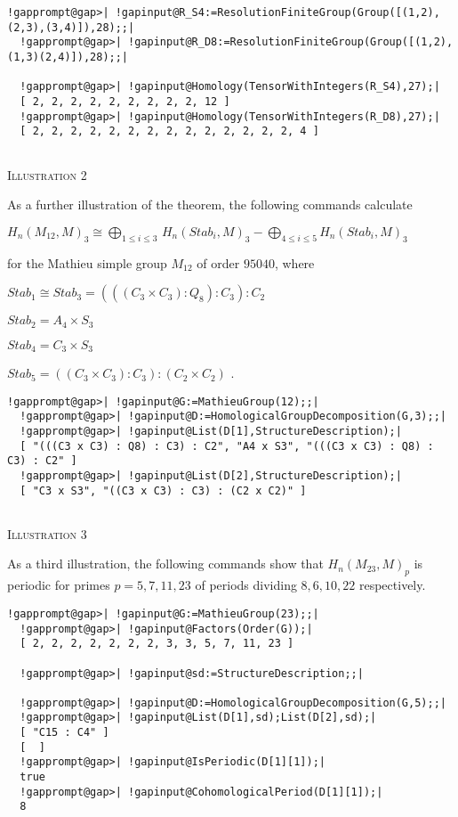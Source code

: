 \documentclass[a4paper,11pt]{report}
\begin{document}
{{\begin{Verbatim}[commandchars=!@|,fontsize=\small,frame=single,label=Example]
  !gapprompt@gap>| !gapinput@R_S4:=ResolutionFiniteGroup(Group([(1,2),(2,3),(3,4)]),28);;|
  !gapprompt@gap>| !gapinput@R_D8:=ResolutionFiniteGroup(Group([(1,2),(1,3)(2,4)]),28);;|
  
  !gapprompt@gap>| !gapinput@Homology(TensorWithIntegers(R_S4),27);|
  [ 2, 2, 2, 2, 2, 2, 2, 2, 2, 12 ]
  !gapprompt@gap>| !gapinput@Homology(TensorWithIntegers(R_D8),27);|
  [ 2, 2, 2, 2, 2, 2, 2, 2, 2, 2, 2, 2, 2, 2, 4 ]
  
\end{Verbatim}
 

\textsc{Illustration 2} 

 As a further illustration of the theorem, the following commands calculate 

 $H_n(M_{12},M)_3 \cong \bigoplus_{1\le i\le 3}\,H_n(Stab_i,M)_3 -
\bigoplus_{4\le i\le 5}H_n(Stab_i,M)_3$ 

 for the Mathieu simple group $M_{12}$ of order $95040$, where 

$Stab_1\cong Stab_3=(((C_3 \times C_3) : Q_8) : C_3) : C_2$ 

$Stab_2=A_4 \times S_3$ 

$Stab_4=C_3 \times S_3$ 

$Stab_5=((C_3 \times C_3) : C_3) : (C_2 \times C_2)$ . 
\begin{Verbatim}[commandchars=!@|,fontsize=\small,frame=single,label=Example]
  !gapprompt@gap>| !gapinput@G:=MathieuGroup(12);;|
  !gapprompt@gap>| !gapinput@D:=HomologicalGroupDecomposition(G,3);;|
  !gapprompt@gap>| !gapinput@List(D[1],StructureDescription);|
  [ "(((C3 x C3) : Q8) : C3) : C2", "A4 x S3", "(((C3 x C3) : Q8) : C3) : C2" ]
  !gapprompt@gap>| !gapinput@List(D[2],StructureDescription);|
  [ "C3 x S3", "((C3 x C3) : C3) : (C2 x C2)" ]
  
\end{Verbatim}
 

\textsc{Illustration 3} 

 As a third illustration, the following commands show that $H_n(M_{23},M)_{p}$ is periodic for primes $p=5, 7, 11, 23$ of periods dividing $8, 6, 10, 22$ respectively. 
\begin{Verbatim}[commandchars=!@|,fontsize=\small,frame=single,label=Example]
  !gapprompt@gap>| !gapinput@G:=MathieuGroup(23);;|
  !gapprompt@gap>| !gapinput@Factors(Order(G));|
  [ 2, 2, 2, 2, 2, 2, 2, 3, 3, 5, 7, 11, 23 ]
  
  !gapprompt@gap>| !gapinput@sd:=StructureDescription;;|
  
  !gapprompt@gap>| !gapinput@D:=HomologicalGroupDecomposition(G,5);;|
  !gapprompt@gap>| !gapinput@List(D[1],sd);List(D[2],sd);|
  [ "C15 : C4" ]
  [  ]
  !gapprompt@gap>| !gapinput@IsPeriodic(D[1][1]);|
  true
  !gapprompt@gap>| !gapinput@CohomologicalPeriod(D[1][1]);|
  8
  

\end{Verbatim}}}
\end{document}
